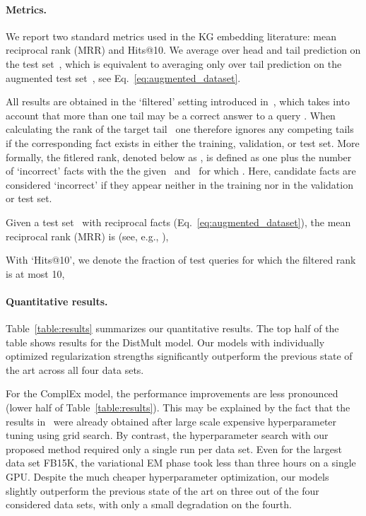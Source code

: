\documentclass[letterpage]{article}
\begin{document}
\paragraph{Metrics.}
We report two standard metrics used in the KG embedding literature: mean reciprocal rank (MRR) and Hits@10.
We average over head and tail prediction on the test set~, which is equivalent to averaging only over tail prediction on the augmented test set~, see Eq.~\ref{eq:augmented_dataset}.

All results are obtained in the `filtered' setting introduced in~\citep{BUGWY2013}, which takes into account that more than one tail may be a correct answer to a query .
When calculating the rank of the target tail~ one therefore ignores any competing tails~ if the corresponding fact  exists in either the training, validation, or test set.
More formally, the fitlered rank, denoted below as , is defined as one plus the number of `incorrect' facts  with the the given~ and~ for which .
Here, candidate facts  are considered `incorrect' if they appear neither in the training nor in the validation or test set.

Given a test set~ with reciprocal facts (Eq.~\ref{eq:augmented_dataset}), the mean reciprocal rank (MRR) is (see, e.g., \citep{BWXJL2015}),

With `Hits@10', we denote the fraction of test queries for which the filtered rank is at most 10,



\paragraph{Quantitative results.}
Table~\ref{table:results} summarizes our quantitative results.
The top half of the table shows results for the DistMult model.
Our models with individually optimized regularization strengths significantly outperform the previous state of the art across all four data sets.

For the ComplEx model, the performance improvements are less pronounced (lower half of Table~\ref{table:results}).
This may be explained by the fact that the results in~\citep{LUO2018} were already obtained after large scale expensive hyperparameter tuning using grid search.
By contrast, the hyperparameter search with our proposed method required only a single run per data set.
Even for the largest data set FB15K, the variational EM phase took less than three hours on a single GPU.
Despite the much cheaper hyperparameter optimization, our models slightly outperform the previous state of the art on three out of the four considered data sets, with only a small degradation on the fourth.
\end{document}
